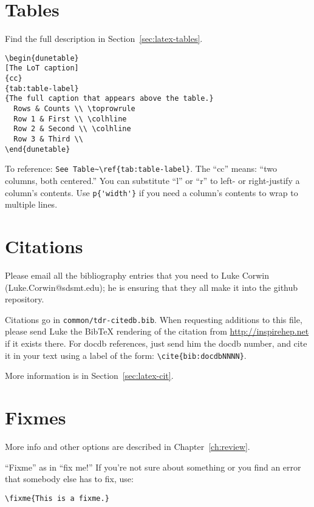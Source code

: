 \section{Tables}
\begin{framed}
Find the full description in Section~\ref{sec:latex-tables}.
\begin{verbatim}
\begin{dunetable}
[The LoT caption]
{cc}
{tab:table-label}
{The full caption that appears above the table.}
  Rows & Counts \\ \toprowrule
  Row 1 & First \\ \colhline
  Row 2 & Second \\ \colhline
  Row 3 & Third \\ 
\end{dunetable}
\end{verbatim}
To reference: \verb|See Table~\ref{tab:table-label}|. The ``cc'' means: ``two columns, both centered.'' You can substitute ``l'' or ``r'' to left- or right-justify a column's contents. Use \verb|p{'width'}| if you need a column's contents to wrap to multiple lines.
\end{framed}

\section{Citations}
\begin{framed}
Please email all the bibliography entries that you need to Luke Corwin (Luke.Corwin@sdsmt.edu); he is ensuring that they all make it into the github repository. 

Citations go in \texttt{common/tdr-citedb.bib}. When requesting additions to this file, please send Luke the BibTeX rendering of the citation from \url{http://inspirehep.net} if it exists there. For docdb references, just send him the docdb number, and cite it in your text using a label of the form:  \verb|\cite{bib:docdbNNNN}|.

More information is in Section~\ref{sec:latex-cit}.
\end{framed}

\section{Fixmes}
More info and other options are described in Chapter~\ref{ch:review}.

\begin{framed}
``Fixme'' as in ``fix me!'' If you're not sure about something or you find an error that somebody else has to fix, use:
\begin{verbatim}
\fixme{This is a fixme.}
\end{verbatim}
\end{framed}

